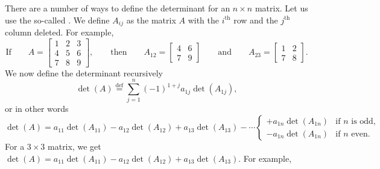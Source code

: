 \documentclass{ximera}
\begin{document}
There are a number of ways to define the determinant for an $n \times n$ matrix.  Let us use the so-called \emph{}. We define $A_{ij}$ as the matrix $A$ with the $i^{\text{th}}$ row and the $j^{\text{th}}$ column deleted.  For example,
\begin{equation*}
    \text{If} \qquad
    A = 
    \begin{bmatrix}
        1 & 2 & 3 \\
        4 & 5 & 6 \\
        7 & 8 & 9
    \end{bmatrix} ,
    \qquad \text{then} \qquad A_{12} = 
    \begin{bmatrix}
        4 & 6 \\
        7 & 9
    \end{bmatrix}
    \qquad \text{and} \qquad A_{23} = 
    \begin{bmatrix}
        1 & 2 \\
        7 & 8
    \end{bmatrix} .
\end{equation*}
We now define the determinant recursively
\begin{equation*}
\det (A) \overset{\text{def}}{=} \sum_{j=1}^n {(-1)}^{1+j} a_{1j} \det (A_{1j}) ,
\end{equation*}
or in other words
\begin{equation*}
    \det (A) = a_{11} \det (A_{11}) - a_{12} \det (A_{12}) +  a_{13} \det (A_{13}) -  \cdots
    \begin{cases}
        + a_{1n} \det (A_{1n}) & \text{if } n \text{ is odd,} \\
        - a_{1n} \det (A_{1n}) & \text{if } n \text{ even.}
    \end{cases}
\end{equation*}
For a $3 \times 3$ matrix, we get $\det (A) = a_{11} \det (A_{11}) - a_{12} \det (A_{12}) + a_{13} \det (A_{13})$.  For example,
\end{document}
